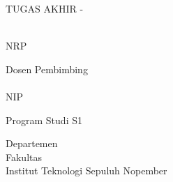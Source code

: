 \begin{large}
  TUGAS AKHIR - \coursecode{}
\end{large}

\vspace{\fill}

\begin{spacing}{1.5}
  \begin{Large}
    \tatitle{}
  \end{Large}
\end{spacing}

\vspace{\fill}

\begin{large}
  \name{} \\
  \textmd{NRP \nrp{}}
\end{large}

\vspace{\fill}

\begin{large}
  \textmd{Dosen Pembimbing} \\
  \advisor{} \\
  \textmd{NIP \advisornip{}} \\
\end{large}

\vspace{\fill}

Program Studi S1 \studyprogram{} \\

\mdseries

Departemen \department{} \\
Fakultas \faculty{} \\
Institut Teknologi Sepuluh Nopember

\place{} \\ \the\year{}
